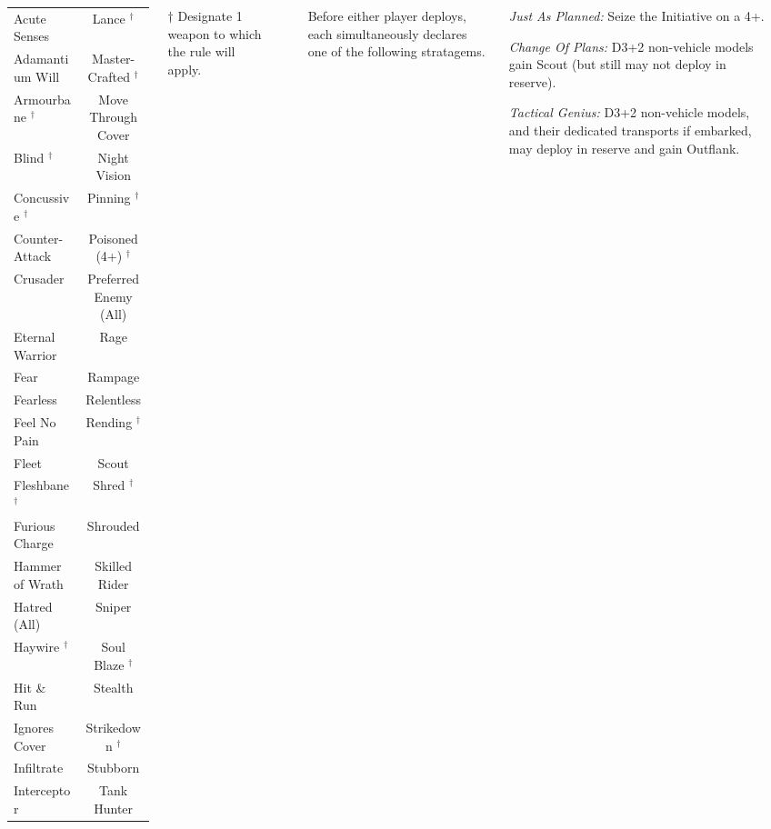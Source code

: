 \begin{columns}
\vspace*{6pt}
\hrule
\noindent\begin{tabular*}{\linewidth}{>{\centering}p{0.5\linewidth} c}
  Acute Senses & Lance $^\dagger$ \\
  Adamantium Will & Master-Crafted $^\dagger$ \\
  Armourbane $^\dagger$ & Move Through Cover \\
  Blind $^\dagger$ & Night Vision \\
  Concussive $^\dagger$ & Pinning $^\dagger$ \\
  Counter-Attack & Poisoned (4+) $^\dagger$ \\
  Crusader & Preferred Enemy (All) \\
  Eternal Warrior & Rage \\
  Fear & Rampage \\
  Fearless & Relentless \\
  Feel No Pain & Rending $^\dagger$ \\
  Fleet & Scout \\
  Fleshbane $^\dagger$ & Shred $^\dagger$ \\
  Furious Charge & Shrouded \\
  Hammer of Wrath & Skilled Rider \\
  Hatred (All) & Sniper \\ 
  Haywire $^\dagger$ & Soul Blaze $^\dagger$ \\
  Hit \& Run & Stealth \\
  Ignores Cover & Strikedown $^\dagger$ \\
  Infiltrate & Stubborn \\
  Interceptor & Tank Hunter \\ 
\end{tabular*}

\smallskip
\centerline{$\dagger$ Designate 1 weapon to which the rule will apply.}
\hrule

  Before either player deploys, each
simultaneously declares one of the following stratagems.

\begin{squishitemize}%
\item \emph{Just As Planned:} Seize the Initiative on a 4+.

\item \emph{Change Of Plans:} D3+2 non-vehicle models gain Scout (but
  still may not deploy in reserve).

\item \emph{Tactical Genius:} D3+2 non-vehicle models, and their
  dedicated transports if embarked, may deploy in reserve and gain
  Outflank.


\end{squishitemize}
\end{columns}
